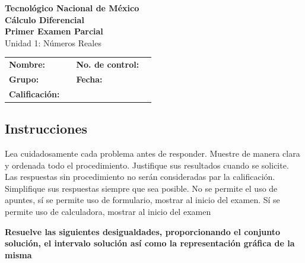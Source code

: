 \documentclass[12pt]{article}
\newcommand{\institucion}{Tecnológico Nacional de México}
\newcommand{\materia}{Cálculo Diferencial}
\newcommand{\nombreexamen}{Primer Examen Parcial}
\newcommand{\unidad}{Unidad 1: Números Reales}
\newcounter{problema}
\begin{document}

\begin{center}
    {\Large\textbf{\institucion}}\\[0.3em]
    {\large\textbf{\materia}}\\[0.3em]
    {\large\textbf{\nombreexamen}}\\[0.3em]
    {\normalsize\unidad}
\end{center}

\vspace{0.5em}


\begin{tabularx}{\textwidth}{>{\bfseries}l X >{\bfseries}l X}
Nombre: & \hrulefill &
No. de control: & \hrulefill \\[1.2em]

Grupo: & \hrulefill &
Fecha: & \hrulefill \\[1.2em]

Calificación: & \hrulefill &

\end{tabularx}

\vspace{1em}



\subsection*{Instrucciones}
Lea cuidadosamente cada problema antes de responder. Muestre de manera clara y ordenada todo el procedimiento. Justifique sus resultados cuando se solicite. Las respuestas sin procedimiento no serán consideradas par la calificaci\'on. Simplifique sus respuestas siempre que sea posible. No se permite el uso de apuntes, sí se permite uso de formulario, mostrar al inicio del examen. Sí se permite uso de calculadora, mostrar al inicio del examen

\medskip


\textbf{ Resuelve las siguientes desigualdades, proporcionando el conjunto  solución, el intervalo solución así como la representación gráfica de  la misma}
\end{document}
